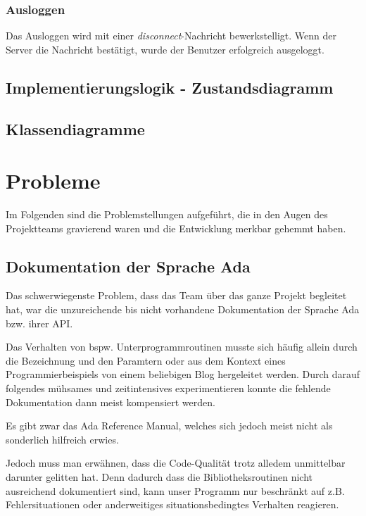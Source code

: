 \documentclass[12pt,a4paper,bibliography=totocnumbered,listof=totocnumbered]{scrartcl}
\begin{document}


\subsubsection{Ausloggen}
Das Ausloggen wird mit einer \textit{disconnect}-Nachricht bewerkstelligt. Wenn der Server die Nachricht bestätigt, wurde der Benutzer erfolgreich ausgeloggt.




\subsection{Implementierungslogik - Zustandsdiagramm}

\subsection{Klassendiagramme}

\section{Probleme}
Im Folgenden sind die Problemstellungen aufgeführt, die in den Augen des Projektteams gravierend waren und die Entwicklung merkbar gehemmt haben.

\subsection{Dokumentation der Sprache Ada}
Das schwerwiegenste Problem, dass das Team über das ganze Projekt begleitet hat, war die unzureichende bis nicht vorhandene Dokumentation der Sprache Ada bzw. ihrer API.

Das Verhalten von bspw. Unterprogrammroutinen musste sich häufig allein durch die Bezeichnung und den Paramtern oder aus dem Kontext eines Programmierbeispiels von einem beliebigen Blog hergeleitet werden. Durch darauf folgendes mühsames und zeitintensives experimentieren konnte die fehlende Dokumentation dann meist kompensiert werden.

Es gibt zwar das Ada Reference Manual, welches sich jedoch meist nicht als sonderlich hilfreich erwies.

Jedoch muss man erwähnen, dass die Code-Qualität trotz alledem  unmittelbar darunter gelitten hat. Denn dadurch dass die Bibliotheksroutinen nicht ausreichend dokumentiert sind, kann unser Programm nur beschränkt auf z.B. Fehlersituationen oder anderweitiges situationsbedingtes Verhalten reagieren.
\end{document}
